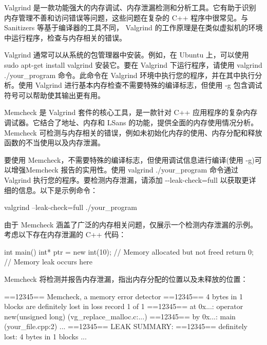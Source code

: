 
Valgrind 是一款功能强大的内存调试、内存泄漏检测和分析工具。它有助于识别内存管理不善和访问错误等问题，这些问题在复杂的 C++ 程序中很常见。与 Sanitizers 等基于编译器的工具不同， Valgrind 的工作原理是在类似虚拟机的环境中运行程序，检查与内存相关的错误。


Valgrind 通常可以从系统的包管理器中安装。例如，在 Ubuntu 上，可以使用 sudo apt-get install valgrind 安装它。要在 Valgrind 下运行程序，请使用 valgrind ./your\_program 命令。此命令在 Valgrind 环境中执行您的程序，并在其中执行分析。使用 Valgrind 进行基本内存检查不需要特殊的编译标志，但使用 -g 包含调试符号可以帮助使其输出更有用。


Memcheck 是 Valgrind 套件的核心工具，是一款针对 C++ 应用程序的复杂内存调试器。它结合了地址、内存和 LSans 的功能，提供全面的内存使用情况分析。 Memcheck 可检测与内存相关的错误，例如未初始化内存的使用、内存分配和释放函数的不当使用以及内存泄漏。

要使用 Memcheck，不需要特殊的编译标志，但使用调试信息进行编译(使用 -g)可以增强Memcheck 报告的实用性。使用 valgrind ./your\_program 命令通过 Valgrind 执行您的程序。要检测内存泄漏，请添加 -{}-leak-check=full 以获取更详细的信息。以下是示例命令：

\begin{shell}
valgrind --leak-check=full ./your_program
\end{shell}

由于 Memcheck 涵盖了广泛的内存相关问题，仅展示一个检测内存泄漏的示例。考虑以下存在内存泄漏的 C++ 代码：

\begin{cpp}
int main() {
    int* ptr = new int(10); // Memory allocated but not freed
    return 0; // Memory leak occurs here
}
\end{cpp}

Memcheck 将检测并报告内存泄漏，指出内存分配的位置以及未释放的位置：

\begin{shell}
==12345== Memcheck, a memory error detector
==12345== 4 bytes in 1 blocks are definitely lost in loss record 1 of 1
==12345== at 0x...: operator new(unsigned long) (vg_replace_malloc.c:...)
==12345== by 0x...: main (your_file.cpp:2)
...
==12345== LEAK SUMMARY:
==12345== definitely lost: 4 bytes in 1 blocks
...
\end{shell}


